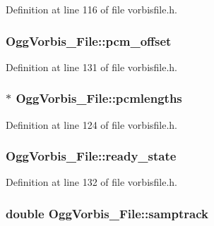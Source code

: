 Definition at line 116 of file vorbisfile.\+h.

\subsubsection[{\texorpdfstring{pcm\+\_\+offset}{pcm_offset}}]{ Ogg\+Vorbis\+\_\+\+File\+::pcm\+\_\+offset}\hypertarget{struct_ogg_vorbis___file_a23d5ba7ca52640ceb6f633a46304cdc5}{}\label{struct_ogg_vorbis___file_a23d5ba7ca52640ceb6f633a46304cdc5}


Definition at line 131 of file vorbisfile.\+h.

\subsubsection[{\texorpdfstring{pcmlengths}{pcmlengths}}]{$\ast$ Ogg\+Vorbis\+\_\+\+File\+::pcmlengths}\hypertarget{struct_ogg_vorbis___file_a88a4e6a4ec6c9837d44e6cc0c864679e}{}\label{struct_ogg_vorbis___file_a88a4e6a4ec6c9837d44e6cc0c864679e}


Definition at line 124 of file vorbisfile.\+h.

\subsubsection[{\texorpdfstring{ready\+\_\+state}{ready_state}}]{ Ogg\+Vorbis\+\_\+\+File\+::ready\+\_\+state}\hypertarget{struct_ogg_vorbis___file_ad304fe18bebc075c34f2e5ec7d1f2a99}{}\label{struct_ogg_vorbis___file_ad304fe18bebc075c34f2e5ec7d1f2a99}


Definition at line 132 of file vorbisfile.\+h.

\subsubsection[{\texorpdfstring{samptrack}{samptrack}}]{\setlength{\rightskip}{0pt plus 5cm}double Ogg\+Vorbis\+\_\+\+File\+::samptrack}\hypertarget{struct_ogg_vorbis___file_a3fcbfeaad027ada99496dfcaf94866a9}{}\label{struct_ogg_vorbis___file_a3fcbfeaad027ada99496dfcaf94866a9}


